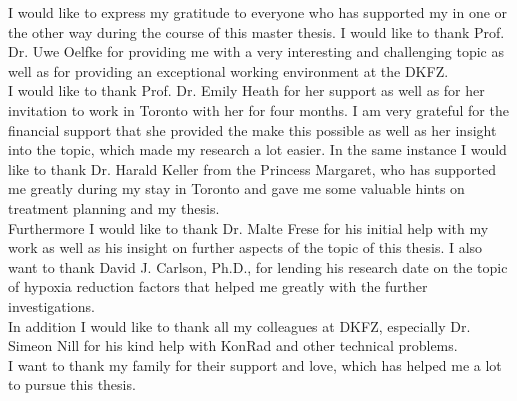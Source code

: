 %
I would like to express my gratitude to everyone who has supported my in one or the other way during the course of this master thesis. I would like to thank Prof. Dr. Uwe Oelfke for providing me with a very interesting and challenging topic as well as for providing an exceptional working environment at the DKFZ.\\I would like to thank Prof. Dr. Emily Heath for her support as well as for her invitation to work in Toronto with her for four months. I am very grateful for the financial support that she provided the make this possible as well as her insight into the topic, which made my research a lot easier. In the same instance I would like to thank Dr. Harald Keller from the Princess Margaret, who has supported me greatly during my stay in Toronto and gave me some valuable hints on treatment planning and my thesis.\\Furthermore I would like to thank Dr. Malte Frese for his initial help with my work as well as his insight on further aspects of the topic of this thesis. I also want to thank David J. Carlson, Ph.D., for lending his research date on the topic of hypoxia reduction factors that helped me greatly with the further investigations.\\In addition I would like to thank all my colleagues at DKFZ, especially Dr. Simeon Nill for his kind help with KonRad and other technical problems.\\I want to thank my family for their support and love, which has helped me a lot to pursue this thesis.